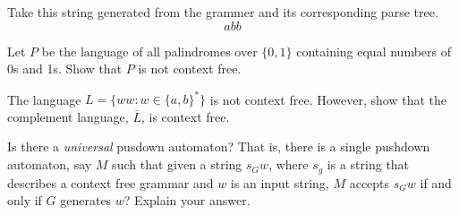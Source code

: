 \documentclass[12pt]{exam}
\begin{document}
\begin{questions}
  \begin{solution}

    Take this string generated from the grammer and its corresponding parse tree.
    \[abb\]




  \end{solution}


  \question{}
  Let $P$ be the language of all palindromes over $\{0,1\}$ containing equal numbers of 0s and 1s. Show that $P$ is not context free.


  \question{}
  The language $L=\{ww: w\in \{a,b\}^{*}\}$ is not context free. However, show that the complement language, $\bar{L}$, is context free.

  \question{}
  Is there a \emph{universal} pusdown automaton? That is, there is a single pushdown automaton, say $M$ such that given a string $s_{G}w$, where $s_{g}$ is a string that describes a context free grammar and $w$ is an input string, $M$ accepts $s_{G}w$ if and only if $G$ generates $w$? Explain your answer.
\end{questions}
\end{document}
